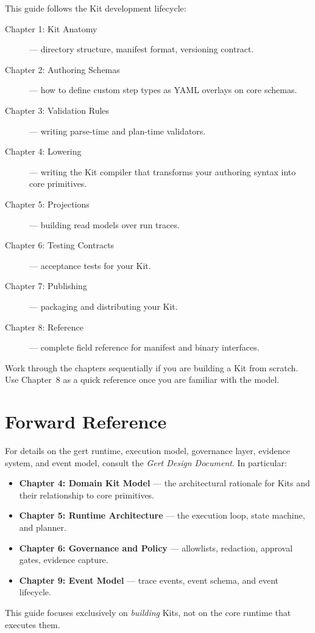 This guide follows the Kit development lifecycle:

\begin{description}
  \item[Chapter 1: Kit Anatomy] --- directory structure, manifest format,
    versioning contract.
  \item[Chapter 2: Authoring Schemas] --- how to define custom step types as
    YAML overlays on core schemas.
  \item[Chapter 3: Validation Rules] --- writing parse-time and plan-time
    validators.
  \item[Chapter 4: Lowering] --- writing the Kit compiler that transforms your
    authoring syntax into core primitives.
  \item[Chapter 5: Projections] --- building read models over run traces.
  \item[Chapter 6: Testing Contracts] --- acceptance tests for your Kit.
  \item[Chapter 7: Publishing] --- packaging and distributing your Kit.
  \item[Chapter 8: Reference] --- complete field reference for manifest and
    binary interfaces.
\end{description}

Work through the chapters sequentially if you are building a Kit from scratch.
Use Chapter~8 as a quick reference once you are familiar with the model.

\section{Forward Reference}
\label{sec:forward-ref}

For details on the gert runtime, execution model, governance layer, evidence
system, and event model, consult the \emph{Gert Design Document}. In
particular:

\begin{itemize}
  \item \textbf{Chapter 4: Domain Kit Model} --- the architectural rationale
    for Kits and their relationship to core primitives.
  \item \textbf{Chapter 5: Runtime Architecture} --- the execution loop, state
    machine, and planner.
  \item \textbf{Chapter 6: Governance and Policy} --- allowlists, redaction,
    approval gates, evidence capture.
  \item \textbf{Chapter 9: Event Model} --- trace events, event schema, and
    event lifecycle.
\end{itemize}

This guide focuses exclusively on \emph{building} Kits, not on the core runtime
that executes them.
